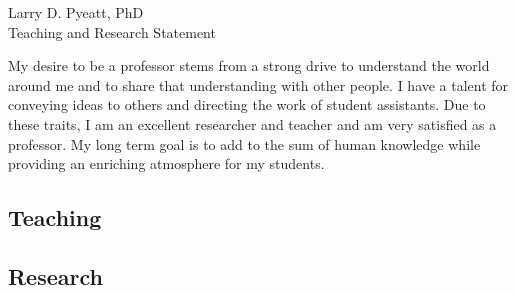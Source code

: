 \documentclass[11pt]{article}
\begin{document}
\pagestyle{fancyplain}
\thispagestyle{empty}

\begin{center}
{\Large \bf
\begin{minipage}{0.75\textwidth}
\vspace*{-\baselineskip}
\begin{center}
Larry D. Pyeatt, PhD \\ Teaching and Research Statement
\end{center}
\end{minipage}
}
\end{center}

\vspace{\baselineskip}
My desire to be a professor stems from a strong drive to understand the
world around me and to share that understanding with other people.  I have
a talent for conveying ideas to others and directing the work of student
assistants.  Due to these traits, I am an excellent researcher and teacher
and am very satisfied as a professor.  My long term goal is to add to the
sum of human knowledge while providing an enriching atmosphere for my
students.

\subsection*{Teaching}


\subsection*{Research}

\end{document}
